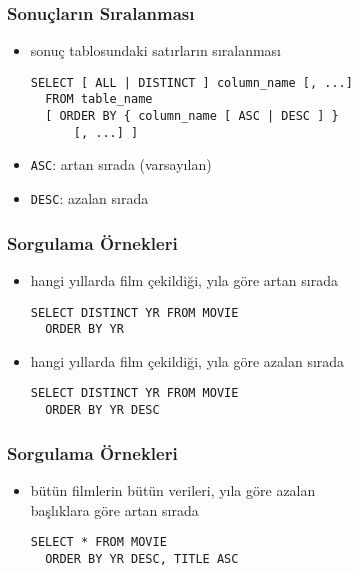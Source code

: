 \documentclass[dvipsnames]{beamer}
\theoremstyle{plain}
\begin{document}
\begin{frame}[fragile]
  \frametitle{Sonuçların Sıralanması}

  \begin{itemize}
    \item sonuç tablosundaki satırların sıralanması
    \begin{lstlisting}
SELECT [ ALL | DISTINCT ] column_name [, ...]
  FROM table_name
  [ ORDER BY { column_name [ ASC | DESC ] }
      [, ...] ]
    \end{lstlisting}


    \medskip
    \item \lstinline!ASC!: artan sırada (varsayılan)
    \item \lstinline!DESC!: azalan sırada
  \end{itemize}
\end{frame}

\begin{frame}[fragile]
  \frametitle{Sorgulama Örnekleri}

  \begin{itemize}
  \item hangi yıllarda film çekildiği, yıla göre artan sırada
    \begin{lstlisting}
SELECT DISTINCT YR FROM MOVIE
  ORDER BY YR
    \end{lstlisting}

  \pause
  \item hangi yıllarda film çekildiği, yıla göre azalan sırada
    \begin{lstlisting}
SELECT DISTINCT YR FROM MOVIE
  ORDER BY YR DESC
    \end{lstlisting}
  \end{itemize}
\end{frame}

\begin{frame}[fragile]
  \frametitle{Sorgulama Örnekleri}

  \begin{itemize}
    \item bütün filmlerin bütün verileri, yıla göre azalan\\
      başlıklara göre artan sırada
    \begin{lstlisting}
SELECT * FROM MOVIE
  ORDER BY YR DESC, TITLE ASC
    \end{lstlisting}
  \end{itemize}
\end{frame}
\end{document}
